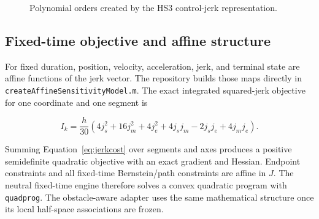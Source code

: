 \documentclass[10pt,letterpaper]{article}
\newcommand{\file}[1]{\nolinkurl{#1}}
\begin{document}
\begin{figure}[ht]
\centering
{}
\caption{Polynomial orders created by the HS3 control-jerk representation.}
\end{figure}

\subsection{Fixed-time objective and affine structure}

For fixed duration, position, velocity, acceleration, jerk, and terminal state
are affine functions of the jerk vector. The repository builds those maps
directly in \file{createAffineSensitivityModel.m}. The exact integrated
squared-jerk objective for one coordinate and one segment is

\begin{equation}\label{eq:jerkcost}
I_k=\frac{h}{30}\left(
4j_s^2+16j_m^2+4j_e^2+4j_sj_m-2j_sj_e+4j_mj_e
\right).
\end{equation}

Summing Equation~\eqref{eq:jerkcost} over segments and axes produces a
positive semidefinite quadratic objective with an exact gradient and Hessian.
Endpoint constraints and all fixed-time Bernstein/path constraints are affine
in $J$. The neutral fixed-time engine therefore solves a convex quadratic
program with \file{quadprog}\cite{mathworksQuadprog}. The obstacle-aware
adapter uses the same mathematical structure once its local half-space
associations are frozen.
\end{document}
